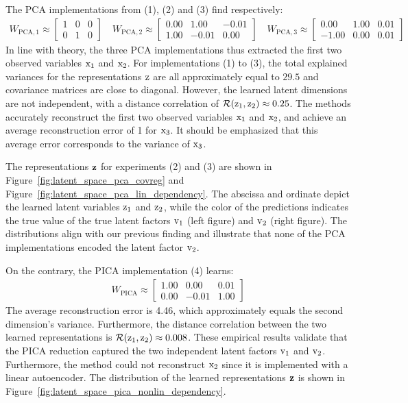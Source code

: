 The PCA implementations from (1), (2) and (3) find respectively:
\begin{align}
    W_{\mathrm{PCA,1}} \approx 
    \begin{bmatrix}
        1 & 0 & 0 \\
        0 & 1 & 0
    \end{bmatrix} 
    \quad W_{\mathrm{PCA,2}} \approx 
    \begin{bmatrix}
        0.00 & 1.00 & -0.01 \\
        1.00 & -0.01 & 0.00
    \end{bmatrix} 
    \quad W_{\mathrm{PCA,3}} \approx 
    \begin{bmatrix}
        0.00 & 1.00 & 0.01 \\
        -1.00 & 0.00 & 0.01
    \end{bmatrix} 
\end{align} 
In line with theory, the three PCA implementations thus extracted the first two observed variables ${\textnormal{x}}_1$ and ${\textnormal{x}}_2$. 
For implementations (1) to (3), the total explained variances for the representations ${\textnormal{z}}$ are all approximately equal to $29.5$ and covariance matrices are close to diagonal. 
However, the learned latent dimensions are not independent, with a distance correlation of $\mathcal{R}({\textnormal{z}}_1, {\textnormal{z}}_2) \approx 0.25$.
The methods accurately reconstruct the first two observed variables ${\textnormal{x}}_1$ and ${\textnormal{x}}_2$, and achieve an average reconstruction error of 1 for ${\textnormal{x}}_3$. It should be emphasized that this average error corresponds to the variance of ${\textnormal{x}}_3$. 

The representations ${\mathbf{z}}$ for experiments (2) and (3) are shown in Figure~\ref{fig:latent_space_pca_covreg} and Figure~\ref{fig:latent_space_pca_lin_dependency}. The abscissa and ordinate depict the learned latent variables ${\textnormal{z}}_1$ and ${\textnormal{z}}_2$, while the color of the predictions indicates the true value of the true latent factors ${\textnormal{v}}_1$ (left figure) and ${\textnormal{v}}_2$ (right figure). The distributions align with our previous finding and illustrate that none of the PCA implementations encoded the latent factor ${\textnormal{v}}_2$. 

On the contrary, the PICA implementation (4) learns:
\begin{align}
    W_{\mathrm{PICA}} \approx 
    \begin{bmatrix}
        1.00 & 0.00 & 0.01 \\
        0.00 & -0.01 & 1.00
    \end{bmatrix} 
\end{align}
The average reconstruction error is 4.46, which approximately equals the second dimension's variance. 
Furthermore, the distance correlation between the two learned representations is $\mathcal{R}({\textnormal{z}}_1, {\textnormal{z}}_2) \approx 0.008$. 
These empirical results validate that the PICA reduction captured the two independent latent factors ${\textnormal{v}}_1$ and ${\textnormal{v}}_2$. Furthermore, the method could not reconstruct ${\textnormal{x}}_2$ since it is implemented with a linear autoencoder. 
The distribution of the learned representations ${\mathbf{z}}$ is shown in Figure~\ref{fig:latent_space_pica_nonlin_dependency}. 

